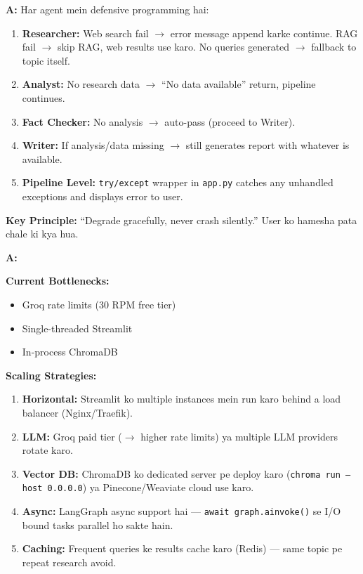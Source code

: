 \documentclass[12pt, a4paper]{article}
\begin{document}
\begin{interviewbox}[title={\faIcon{user-tie} ~Q9: Agar ek agent fail ho jaye toh kya hoga?}]
\textbf{A:} Har agent mein defensive programming hai:

\begin{enumerate}
\item \textbf{Researcher:} Web search fail $\rightarrow$ error message append karke continue. RAG fail $\rightarrow$ skip RAG, web results use karo. No queries generated $\rightarrow$ fallback to topic itself.

\item \textbf{Analyst:} No research data $\rightarrow$ ``No data available'' return, pipeline continues.

\item \textbf{Fact Checker:} No analysis $\rightarrow$ auto-pass (proceed to Writer).

\item \textbf{Writer:} If analysis/data missing $\rightarrow$ still generates report with whatever is available.

\item \textbf{Pipeline Level:} \texttt{try/except} wrapper in \texttt{app.py} catches any unhandled exceptions and displays error to user.
\end{enumerate}

\textbf{Key Principle:} ``Degrade gracefully, never crash silently.'' User ko hamesha pata chale ki kya hua.
\end{interviewbox}

\begin{interviewbox}[title={\faIcon{user-tie} ~Q10: Project ki scalability discuss karo.}]
\textbf{A:}

\textbf{Current Bottlenecks:}
\begin{itemize}
\item Groq rate limits (30 RPM free tier)
\item Single-threaded Streamlit
\item In-process ChromaDB
\end{itemize}

\textbf{Scaling Strategies:}
\begin{enumerate}
\item \textbf{Horizontal:} Streamlit ko multiple instances mein run karo behind a load balancer (Nginx/Traefik).
\item \textbf{LLM:} Groq paid tier ($\rightarrow$ higher rate limits) ya multiple LLM providers rotate karo.
\item \textbf{Vector DB:} ChromaDB ko dedicated server pe deploy karo (\texttt{chroma run --host 0.0.0.0}) ya Pinecone/Weaviate cloud use karo.
\item \textbf{Async:} LangGraph async support hai --- \texttt{await graph.ainvoke()} se I/O bound tasks parallel ho sakte hain.
\item \textbf{Caching:} Frequent queries ke results cache karo (Redis) --- same topic pe repeat research avoid.
\end{enumerate}
\end{interviewbox}
\end{document}
